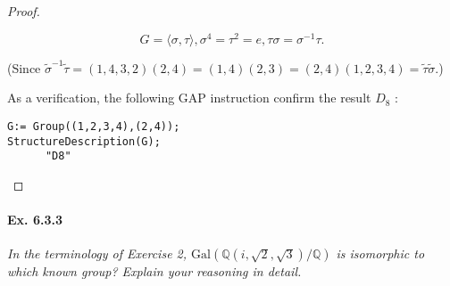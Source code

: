 \documentclass[11pt,a4paper]{article}
\newcommand{\Q}{\mathbb{Q}}
\newcommand{\Gal}{\mathrm{Gal}}
\begin{document}
\begin{proof}
\begin{enumerate}
$$G = \langle \sigma, \tau \rangle, \sigma^4 = \tau^2 = e, \tau \sigma = \sigma^{-1} \tau.$$

(Since $\tilde{\sigma}^{-1} \tilde{\tau} = (1,4,3,2) (2,4)  = (1,4)(2,3) =(2,4) (1,2,3,4)= \tilde{\tau} \tilde{\sigma}$.)

As a verification, the following GAP instruction confirm the result $D_8$ : 
\begin{verbatim}
G:= Group((1,2,3,4),(2,4));
StructureDescription(G);
	  "D8"
\end{verbatim}
\end{enumerate}
\end{proof}

\paragraph{Ex. 6.3.3}

{\it In the terminology of Exercise 2, $\Gal(\Q(i,\sqrt{2},\sqrt{3})/\Q)$ is isomorphic to which known group? Explain your reasoning in detail.
}
\end{document}
